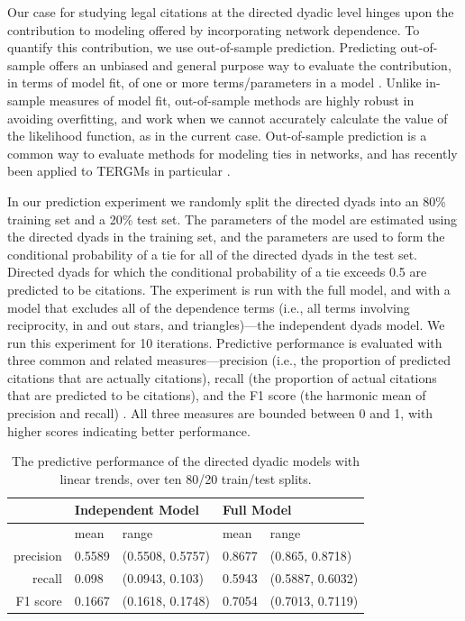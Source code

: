 \documentclass[headsepline=true, abstracton]{scrartcl}
\begin{document}
Our case for studying legal citations at the directed dyadic level hinges upon the contribution to modeling offered by incorporating network dependence. To quantify this contribution, we use out-of-sample prediction. Predicting out-of-sample offers an unbiased and general purpose way to evaluate the contribution, in terms of model fit, of one or more terms/parameters in a model \citep{jensen2000multiple,ward2010perils}. Unlike in-sample measures of model fit, out-of-sample methods are highly robust in avoiding overfitting, and work when we cannot accurately calculate the value of the likelihood function, as in the current case. Out-of-sample prediction is a common way to evaluate methods for modeling ties in networks, and has recently been applied to TERGMs in particular \citep{desmarais2013forecasting,cranmer2017can}.

In our prediction experiment we randomly split the directed dyads into an 80\% training set and a 20\% test set. The parameters of the model are estimated using the directed dyads in the training set, and the parameters are used to form the conditional probability of a tie for all of the directed dyads in the test set. Directed dyads for which the conditional probability of a tie exceeds 0.5 are predicted to be citations. The experiment is run with the full model, and with a model that excludes all of the dependence terms (i.e., all terms involving reciprocity, in and out stars, and triangles)---the independent dyads model. We run this experiment for 10 iterations. Predictive performance is evaluated with three common and related measures---precision (i.e., the proportion of predicted citations that are actually citations), recall (the proportion of actual citations that are predicted to be citations), and the F1 score (the harmonic mean of precision and recall) \citep[see, e.g.,][for discussion of these measures]{makhoul1999performance}. All three measures are bounded between 0 and 1, with higher scores indicating better performance.

\begin{table}[H]
\centering

\begin{tabular}{rllll}
\hline \hline
& \multicolumn{2}{l}{Independent Model } & \multicolumn{2}{l}{Full Model} \\ \hline 
 & mean & range & mean & range \\ 
  \hline
precision & 0.5589 & (0.5508, 0.5757) & 0.8677 & (0.865, 0.8718) \\ 
  recall & 0.098 & (0.0943, 0.103) & 0.5943 & (0.5887, 0.6032) \\ 
  F1 score & 0.1667 & (0.1618, 0.1748) & 0.7054 & (0.7013, 0.7119) \\ 
   \hline \hline
\end{tabular}
\caption{The predictive performance of the directed dyadic models with linear trends, over ten 80/20 train/test splits.}
\label{tab:prediction_linear}

\end{table}
\end{document}
